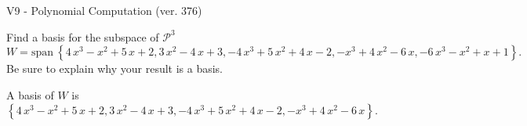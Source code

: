 \begin{exercise}
  \begin{exerciseTitle}V9 - Polynomial Computation (ver. 376)\end{exerciseTitle}
  \begin{exerciseStatement}
    Find a basis for the subspace of \(\mathcal{P}^3\) 
\[W=\mathrm{span}\ \left\{4 \, x^{3} - x^{2} + 5 \, x + 2 , 3 \, x^{2} - 4 \, x + 3 , -4 \, x^{3} + 5 \, x^{2} + 4 \, x - 2 , -x^{3} + 4 \, x^{2} - 6 \, x , -6 \, x^{3} - x^{2} + x + 1\right\}.\]
 Be sure to explain why your result is a basis.


  \end{exerciseStatement}
  \begin{exerciseAnswer}
   A basis of \(W\) is  \(\left\{4 \, x^{3} - x^{2} + 5 \, x + 2 , 3 \, x^{2} - 4 \, x + 3 , -4 \, x^{3} + 5 \, x^{2} + 4 \, x - 2 , -x^{3} + 4 \, x^{2} - 6 \, x\right\}\).
  


  \end{exerciseAnswer}
\end{exercise}